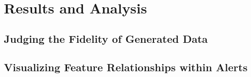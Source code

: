 %
%
%

\chapter{Results and Analysis}

\section{Judging the Fidelity of Generated Data}

\section{Visualizing Feature Relationships within Alerts}
